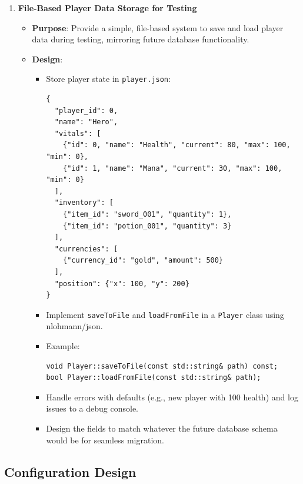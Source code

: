 \begin{enumerate}
    \item \textbf{File-Based Player Data Storage for Testing}
        \begin{itemize}
            \item \textbf{Purpose}: Provide a simple, file-based system to save and load player data during testing, mirroring future database functionality.
            \item \textbf{Design}:
                \begin{itemize}
                    \item Store player state in \texttt{player.json}:
                    \begin{lstlisting}[style=htmlstyle]
{
  "player_id": 0,
  "name": "Hero",
  "vitals": [
    {"id": 0, "name": "Health", "current": 80, "max": 100, "min": 0},
    {"id": 1, "name": "Mana", "current": 30, "max": 100, "min": 0}
  ],
  "inventory": [
    {"item_id": "sword_001", "quantity": 1},
    {"item_id": "potion_001", "quantity": 3}
  ],
  "currencies": [
    {"currency_id": "gold", "amount": 500}
  ],
  "position": {"x": 100, "y": 200}
}
                    \end{lstlisting}
                    \item Implement \texttt{saveToFile} and \texttt{loadFromFile} in a \texttt{Player} class using nlohmann/json.
                    \item Example:
                    \begin{lstlisting}[style=htmlstyle]
void Player::saveToFile(const std::string& path) const;
bool Player::loadFromFile(const std::string& path);
                    \end{lstlisting}
                    \item Handle errors with defaults (e.g., new player with 100 health) and log issues to a debug console.
                    \item Design the fields to match whatever the future database schema would be for seamless migration.
                \end{itemize}
        \end{itemize}
\end{enumerate}















\subsection{Configuration Design}

